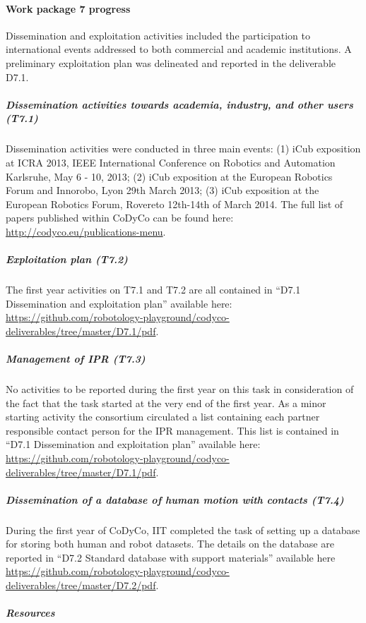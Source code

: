 \documentclass[12pt,a4paper,twoside]{article}
\begin{document}
\paragraph{Work package 7 progress}

Dissemination and exploitation activities included the participation to international events addressed to both commercial and academic institutions. A preliminary exploitation plan was delineated and reported in the deliverable D7.1.

\subparagraph{Dissemination activities towards academia, industry, and other users (T7.1)}

Dissemination activities were conducted in three main events: (1) iCub exposition at ICRA 2013, IEEE International Conference on Robotics and Automation Karlsruhe, May 6 - 10, 2013; (2) iCub exposition at the European Robotics Forum and Innorobo, Lyon 29th March 2013; (3) iCub exposition at the European Robotics Forum, Rovereto 12th-14th of March 2014. The full list of papers published within CoDyCo can be found here: \url{http://codyco.eu/publications-menu}.

\subparagraph{Exploitation plan (T7.2)}

The first year activities on T7.1 and T7.2 are all contained in ``D7.1 Dissemination and exploitation plan'' available here: \url{https://github.com/robotology-playground/codyco-deliverables/tree/master/D7.1/pdf}.

\subparagraph{Management of IPR (T7.3)}

No activities to be reported during the first year on this task in consideration of the fact that the task started at the very end of the first year. As a minor starting activity the consortium circulated a list containing each partner responsible contact person for the IPR management. This list is contained in ``D7.1 Dissemination and exploitation plan'' available here: \url{https://github.com/robotology-playground/codyco-deliverables/tree/master/D7.1/pdf}.

\subparagraph{Dissemination of a database of human motion with contacts (T7.4)}

During the first year of CoDyCo, IIT completed the task of setting up a database for storing both human and robot datasets. The details on the database are reported in ``D7.2 Standard database with support materials'' available here \url{https://github.com/robotology-playground/codyco-deliverables/tree/master/D7.2/pdf}. 

\subparagraph{Resources}
\end{document}
